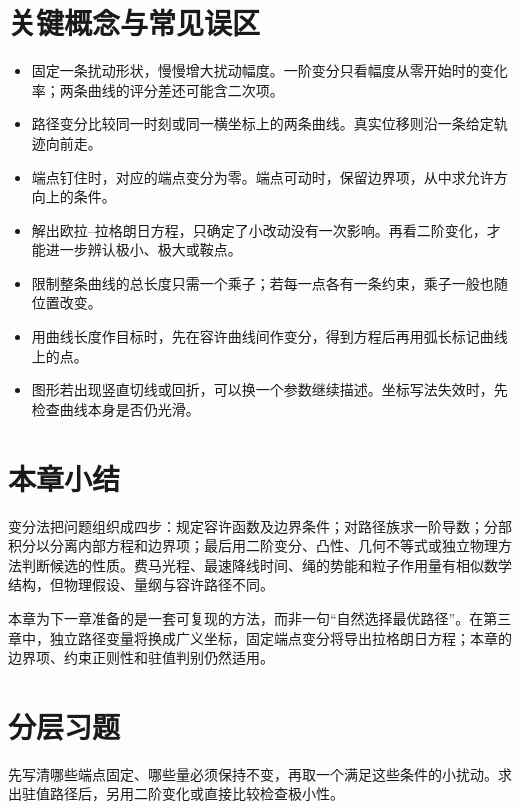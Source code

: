\section*{关键概念与常见误区}
\begin{itemize}[leftmargin=1.8em]
\item 固定一条扰动形状，慢慢增大扰动幅度。一阶变分只看幅度从零开始时的变化率；两条曲线的评分差还可能含二次项。
\item 路径变分比较同一时刻或同一横坐标上的两条曲线。真实位移则沿一条给定轨迹向前走。
\item 端点钉住时，对应的端点变分为零。端点可动时，保留边界项，从中求允许方向上的条件。
\item 解出欧拉--拉格朗日方程，只确定了小改动没有一次影响。再看二阶变化，才能进一步辨认极小、极大或鞍点。
\item 限制整条曲线的总长度只需一个乘子；若每一点各有一条约束，乘子一般也随位置改变。
\item 用曲线长度作目标时，先在容许曲线间作变分，得到方程后再用弧长标记曲线上的点。
\item 图形若出现竖直切线或回折，可以换一个参数继续描述。坐标写法失效时，先检查曲线本身是否仍光滑。
\end{itemize}

\section*{本章小结}
变分法把问题组织成四步：规定容许函数及边界条件；对路径族求一阶导数；分部积分以分离内部方程和边界项；最后用二阶变分、凸性、几何不等式或独立物理方法判断候选的性质。费马光程、最速降线时间、绳的势能和粒子作用量有相似数学结构，但物理假设、量纲与容许路径不同。

本章为下一章准备的是一套可复现的方法，而非一句“自然选择最优路径”。在第三章中，独立路径变量将换成广义坐标，固定端点变分将导出拉格朗日方程；本章的边界项、约束正则性和驻值判别仍然适用。

\section*{分层习题}
先写清哪些端点固定、哪些量必须保持不变，再取一个满足这些条件的小扰动。求出驻值路径后，另用二阶变化或直接比较检查极小性。

